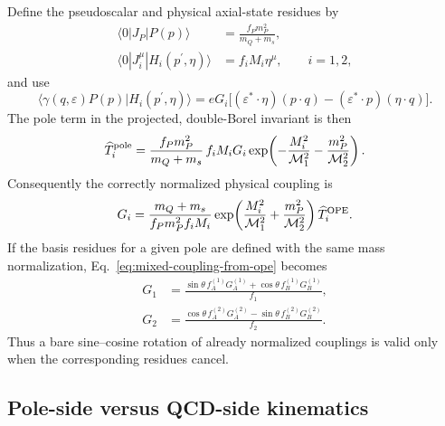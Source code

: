 \documentclass[11pt]{article}
\begin{document}
Define the pseudoscalar and physical axial-state residues by
\begin{align}
  \langle0|J_P|P(p)\rangle
  &=\frac{f_Pm_P^2}{m_Q+m_s},
  \label{eq:pseudoscalar-residue}\\
  \langle0|J_i^\mu|H_i(p^{\prime},\eta)\rangle
  &=f_iM_i\eta^\mu,
  \qquad i=1,2,
  \label{eq:physical-decay-constant-definition}
\end{align}
and use
\begin{equation}
  \langle\gamma(q,\varepsilon)P(p)|H_i(p^{\prime},\eta)\rangle
  =eG_i\big[(\varepsilon^*\!\cdot\eta)(p\cdot q)
  -(\varepsilon^*\!\cdot p)(\eta\cdot q)\big].
  \label{eq:mixed-transition-amplitude}
\end{equation}
The pole term in the projected, double-Borel invariant is then
\begin{equation}
  \widehat T_i^{\rm pole}
  =\frac{f_Pm_P^2}{m_Q+m_s}\,f_iM_iG_i
  \exp\!\left(-\frac{M_i^2}{\mathcal M_1^2}
               -\frac{m_P^2}{\mathcal M_2^2}\right).
  \label{eq:mixed-hadronic-pole}
\end{equation}
Consequently the correctly normalized physical coupling is
\begin{equation}
  G_i=
  \frac{m_Q+m_s}{f_Pm_P^2f_iM_i}
  \exp\!\left(\frac{M_i^2}{\mathcal M_1^2}
              +\frac{m_P^2}{\mathcal M_2^2}\right)
  \widehat T_i^{\rm OPE}.
  \label{eq:mixed-coupling-from-ope}
\end{equation}
If the basis residues for a given pole are defined with the same mass
normalization, Eq.~\eqref{eq:mixed-coupling-from-ope} becomes
\begin{align}
  G_1
  &=\frac{\sin\theta\,f_A^{(1)}G_A^{(1)}
          +\cos\theta\,f_B^{(1)}G_B^{(1)}}{f_1},
  \label{eq:residue-weighted-low}\\
  G_2
  &=\frac{\cos\theta\,f_A^{(2)}G_A^{(2)}
          -\sin\theta\,f_B^{(2)}G_B^{(2)}}{f_2}.
  \label{eq:residue-weighted-high}
\end{align}
Thus a bare sine--cosine rotation of already normalized couplings is valid
only when the corresponding residues cancel.

\subsection{Pole-side versus QCD-side kinematics}
\end{document}
